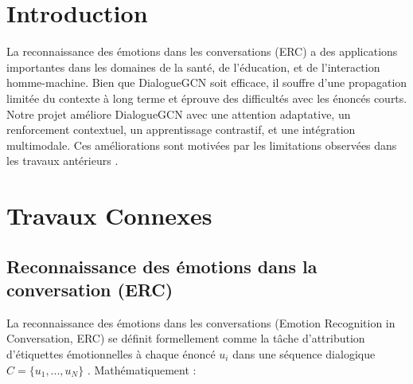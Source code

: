 \documentclass[a4paper,11pt]{article}
\begin{document}

\tableofcontents
\listoffigures
{}

\listoftables
{}
\newpage










\section{Introduction}
La reconnaissance des émotions dans les conversations (ERC) a des applications importantes dans les domaines de la santé, de l'éducation, et de l'interaction homme-machine. Bien que DialogueGCN soit efficace, il souffre d'une propagation limitée du contexte à long terme et éprouve des difficultés avec les énoncés courts. Notre projet améliore DialogueGCN avec une attention adaptative, un renforcement contextuel, un apprentissage contrastif, et une intégration multimodale. Ces améliorations sont motivées par les limitations observées dans les travaux antérieurs \cite{example_reference}.













\section{Travaux Connexes}
\subsection{Reconnaissance des émotions dans la conversation (ERC)}
La reconnaissance des émotions dans les conversations (Emotion Recognition in Conversation, ERC) se définit formellement comme la tâche d'attribution d'étiquettes émotionnelles à chaque énoncé $u_i$ dans une séquence dialogique $C = \{u_1,...,u_N\}$ \cite{poria2019meld}. Mathématiquement :
\end{document}
